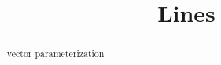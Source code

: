 \documentclass{ximera}
\title{Lines}
\begin{document}
\begin{abstract}
vector parameterization
\end{abstract}
\maketitle
\end{document}
